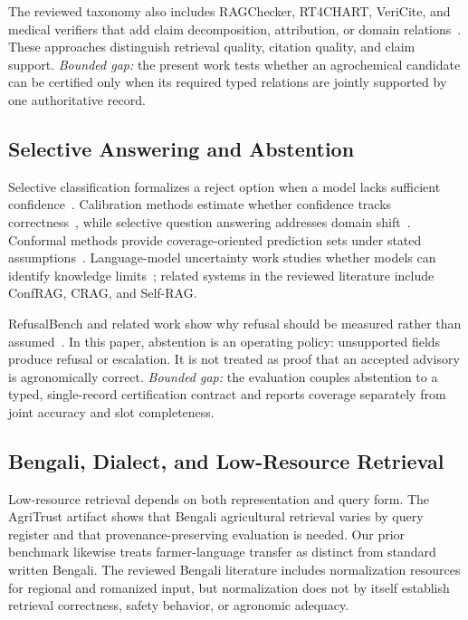 \documentclass[11pt,a4paper]{article}
\begin{document}
The reviewed taxonomy also includes RAGChecker, RT4CHART, VeriCite, and medical verifiers that add claim decomposition, attribution, or domain relations~\cite{rt4chart2026}. These approaches distinguish retrieval quality, citation quality, and claim support. \textit{Bounded gap:} the present work tests whether an agrochemical candidate can be certified only when its required typed relations are jointly supported by one authoritative record.

\subsection{Selective Answering and Abstention}
Selective classification formalizes a reject option when a model lacks sufficient confidence~\cite{geifman2017selective, geifman2019selectivenet}. Calibration methods estimate whether confidence tracks correctness~\cite{guo2017calibration}, while selective question answering addresses domain shift~\cite{kamath2020selective}. Conformal methods provide coverage-oriented prediction sets under stated assumptions~\cite{angelopoulos2023conformal, romano2020classification}. Language-model uncertainty work studies whether models can identify knowledge limits~\cite{kadavath2022language}; related systems in the reviewed literature include ConfRAG, CRAG, and Self-RAG.

RefusalBench and related work show why refusal should be measured rather than assumed~\cite{refusalbench2025}. In this paper, abstention is an operating policy: unsupported fields produce refusal or escalation. It is not treated as proof that an accepted advisory is agronomically correct. \textit{Bounded gap:} the evaluation couples abstention to a typed, single-record certification contract and reports coverage separately from joint accuracy and slot completeness.

\subsection{Bengali, Dialect, and Low-Resource Retrieval}
Low-resource retrieval depends on both representation and query form. The AgriTrust artifact shows that Bengali agricultural retrieval varies by query register and that provenance-preserving evaluation is needed. Our prior benchmark likewise treats farmer-language transfer as distinct from standard written Bengali. The reviewed Bengali literature includes normalization resources for regional and romanized input, but normalization does not by itself establish retrieval correctness, safety behavior, or agronomic adequacy.
\end{document}
